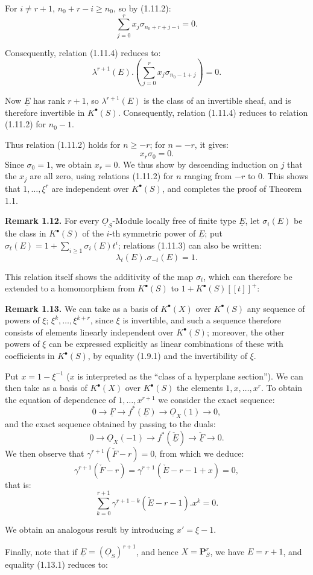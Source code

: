 For \(i\neq r+1\), \(n_0+r-i\geq n_0\), so by (1.11.2):
\[
  \sum_{j=0}^r x_j\sigma_{n_0+r+j-i}=0.
\]

Consequently, relation (1.11.4) reduces to:
\[
  \lambda^{r+1}(E).\left(\sum_{j=0}^r x_j\sigma_{n_0-1+j}\right)=0.
\]

Now \(\underline{E}\) has rank \(r+1\), so \(\lambda^{r+1}(E)\) is the class of an invertible sheaf, and is therefore invertible in \(K^{\bullet}(S)\). Consequently, relation (1.11.4) reduces to relation (1.11.2) for \(n_0-1\).

Thus relation (1.11.2) holds for \(n\geq-r\); for \(n=-r\), it gives:
\[
  x_r\sigma_0=0.
\]
Since \(\sigma_0=1\), we obtain \(x_r=0\). We thus show by descending induction on \(j\) that the \(x_j\) are all zero, using relations (1.11.2) for \(n\) ranging from \(-r\) to \(0\). This shows that \(1,\ldots,\xi^r\) are independent over \(K^{\bullet}(S)\), and completes the proof of Theorem 1.1.

\textbf{Remark 1.12.} For every \(\underline{O}_S\)-Module locally free of finite type \(\underline{E}\), let \(\sigma_i(E)\) be the class in \(K^{\bullet}(S)\) of the \(i\)-th symmetric power of \(\underline{E}\); put \(\sigma_t(E)=1+\sum_{i\geq1}\sigma_i(E)t^i\); relations (1.11.3) can also be written:
%
\begin{equation}\tag{1.12.1}
  \lambda_t(E).\sigma_{-t}(E)=1.
\end{equation}

This relation itself shows the additivity of the map \(\sigma_t\), which can therefore be extended to a homomorphism from \(K^{\bullet}(S)\) to \(1+K^{\bullet}(S)[[t]]^+\):

\textbf{Remark 1.13.} We can take as a basis of \(K^{\bullet}(X)\) over \(K^{\bullet}(S)\) any sequence of powers of \(\xi\); \(\xi^k,\ldots,\xi^{k+r}\), since \(\xi\) is invertible, and such a sequence therefore consists of elements linearly independent over \(K^{\bullet}(S)\); moreover, the other powers of \(\xi\) can be expressed explicitly as linear combinations of these with coefficients in \(K^{\bullet}(S)\), by equality (1.9.1) and the invertibility of \(\xi\).

Put \(x=1-\xi^{-1}\) (\(x\) is interpreted as the ``class of a hyperplane section''). We can then take as a basis of \(K^{\bullet}(X)\) over \(K^{\bullet}(S)\) the elements \(1,x,\ldots,x^r\). To obtain the equation of dependence of \(1,\ldots,x^{r+1}\) we consider the exact sequence:
\[
  0\longrightarrow \underline{F}\longrightarrow f^*(\underline{E})\longrightarrow \underline{O}_X(1)\longrightarrow0,
\]
and the exact sequence obtained by passing to the duals:
\[
  0\longrightarrow \underline{O}_X(-1)\longrightarrow f^*(\check{\underline{E}})\longrightarrow \check{\underline{F}}\longrightarrow0.
\]
We then observe that \(\gamma^{r+1}(\check F-r)=0\), from which we deduce:
\[
  \gamma^{r+1}(\check F-r)=\gamma^{r+1}(\check E-r-1+x)=0,
\]
that is:
\begin{equation}\tag{1.13.1}
  \sum_{k=0}^{r+1}\gamma^{r+1-k}(\check E-r-1).x^k=0.
\end{equation}

We obtain an analogous result by introducing \(x'=\xi-1\).

Finally, note that if \(\underline{E}=(\underline{O}_S)^{r+1}\), and hence \(X=\mathbf P_S^r\), we have \(E=r+1\), and equality (1.13.1) reduces to:

